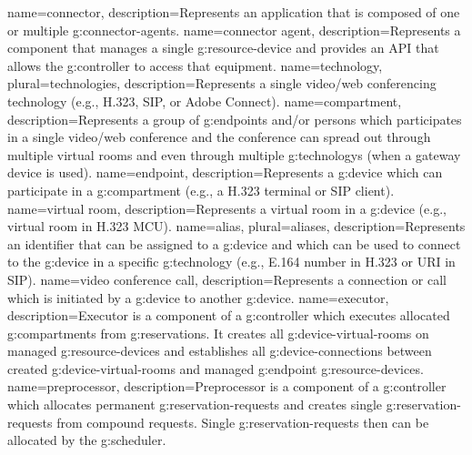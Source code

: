 {
  name=connector,
  description={Represents an application that is composed of one or multiple \glspl{g:connector-agent}.}
}
{
  name=connector agent,
  description={Represents a component that manages a single \gls{g:resource-device} 
    and provides an API that allows the \gls{g:controller} to access that equipment.}
}
{
  name=technology,
  plural=technologies,
  description={Represents a single video/web conferencing technology (e.g., 
    H.323, SIP, or Adobe Connect).}
}
{
  name=compartment,
  description={Represents a group of \glspl{g:endpoint} and/or persons which participates 
    in a single video/web conference and the conference can spread out through multiple 
    virtual rooms and even through multiple \glspl{g:technology} (when a gateway device is used).}
}
{
  name=endpoint,
  description={Represents a \gls{g:device} which can participate in a \gls{g:compartment} (e.g., a H.323 terminal or SIP client).}
}
{
  name=virtual room,
  description={Represents a virtual room in a \gls{g:device} (e.g., virtual room in H.323 MCU).}
}
{
  name=alias,
  plural=aliases,
  description={Represents an identifier that can be assigned to a \gls{g:device} and
    which can be used to connect to the \gls{g:device} in a specific \gls{g:technology} 
    (e.g., E.164 number in H.323 or URI in SIP).}
}
{
  name=video conference call,
  description={Represents a connection or call which is initiated by a 
    \gls{g:device} to another \gls{g:device}.}
}
{
  name=executor,
  description={Executor is a component of a \gls{g:controller} which executes
    allocated \glspl{g:compartment} from \glspl{g:reservation}. It creates
    all \glspl{g:device-virtual-room} on managed \glspl{g:resource-device} and
    establishes all \glspl{g:device-connection} between created 
    \glspl{g:device-virtual-room} and managed \gls{g:endpoint} 
    \glspl{g:resource-device}.}
}
{
  name=preprocessor,
  description={Preprocessor is a component of a \gls{g:controller} which allocates
    permanent \glspl{g:reservation-request} and creates single \glspl{g:reservation-request} 
    from compound requests. Single \glspl{g:reservation-request} then can be allocated 
    by the \gls{g:scheduler}.}
}


